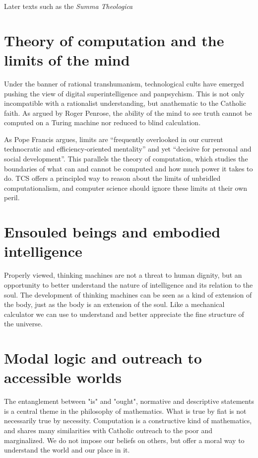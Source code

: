 \documentclass[sigplan,nonacm]{acmart}\settopmatter{printfolios=false,printccs=false,printacmref=false}
\begin{document}
  Later texts such as the \textit{Summa Theologica}

  \section{Theory of computation and the limits of the mind}

  Under the banner of rational transhumanism, technological cults have emerged pushing the view of digital superintelligence and panpsychism. This is not only incompatible with a rationalist understanding, but anathematic to the Catholic faith. As argued by Roger Penrose, the ability of the mind to see truth cannot be computed on a Turing machine nor reduced to blind calculation.

  As Pope Francis argues, limits are ``frequently overlooked in our current technocratic and efficiency-oriented mentality'' and yet ``decisive for personal and social development''. This parallels the theory of computation, which studies the boundaries of what can and cannot be computed and how much power it takes to do. TCS offers a principled way to reason about the limits of unbridled computationalism, and computer science should ignore these limits at their own peril.

  \section{Ensouled beings and embodied intelligence}

  Properly viewed, thinking machines are not a threat to human dignity, but an opportunity to better understand the nature of intelligence and its relation to the soul. The development of thinking machines can be seen as a kind of extension of the body, just as the body is an extension of the soul. Like a mechanical calculator we can use to understand and better appreciate the fine structure of the universe.

  \section{Modal logic and outreach to accessible worlds}

  The entanglement between "is" and "ought", normative and descriptive statements is a central theme in the philosophy of mathematics. What is true by fiat is not necessarily true by necessity. Computation is a constructive kind of mathematics, and shares many similarities with Catholic outreach to the poor and marginalized. We do not impose our beliefs on others, but offer a moral way to understand the world and our place in it.
\end{document}
